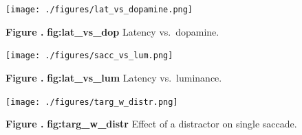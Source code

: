 \documentclass{frontiersSCNS}
\begin{document}
\begin{figure}[htb!]
\begin{center}
\texttt{[image: ./figures/lat\_vs\_dopamine.png]}
\end{center}
\textbf{\label{fig:lat_vs_dop} Figure .}
{ \textbf{fig:lat\_vs\_dop} Latency vs.~dopamine.}
\end{figure}

\begin{figure}[htb!]
\begin{center}
\texttt{[image: ./figures/sacc\_vs\_lum.png]}
\end{center}
\textbf{\label{fig:lat_vs_lum} Figure .}
{ \textbf{fig:lat\_vs\_lum} Latency vs.~luminance.}
\end{figure}

\begin{figure}[htb!]
\begin{center}
\texttt{[image: ./figures/targ\_w\_distr.png]}
\end{center}
\textbf{\label{fig:targ_w_distr} Figure .}
{ \textbf{fig:targ\_w\_distr} Effect of a distractor on single saccade.}
\end{figure}
\end{document}

